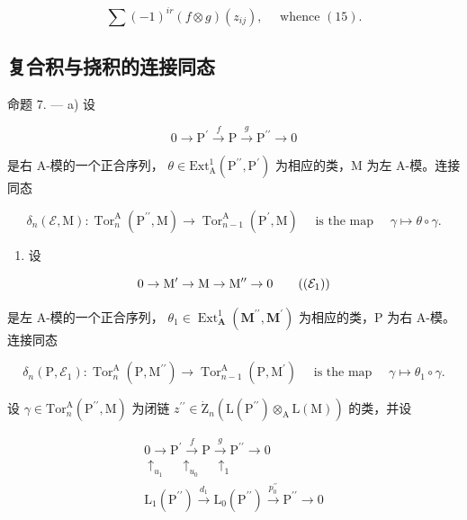 \[
\sum (- 1) ^ {i r} (f \otimes g) (z _ {i j}), \quad \text { whence } (1 5).
\]

\subsection{复合积与挠积的连接同态}

命题 7. --- a) 设

\[
0 \to \mathrm{P} ^ {\prime} \xrightarrow {f} \mathrm{P} \xrightarrow {g} \mathrm{P} ^ {\prime \prime} \to 0\tag{8}
\]

是右 A-模的一个正合序列， \(\theta\in\mathrm{Ext}_{\mathrm{A}}^{1}\left(\mathrm{P}^{\prime\prime},\mathrm{P}^{\prime}\right)\) 为相应的类，M 为左 A-模。连接同态

\[
\delta_ {n} (\mathcal {E}, \mathrm{M}): \operatorname{Tor} _ {n} ^ {\mathrm{A}} \left(\mathrm{P} ^ {\prime \prime}, \mathrm{M}\right)\rightarrow \operatorname{Tor} _ {n - 1} ^ {\mathrm{A}} \left(\mathrm{P} ^ {\prime}, \mathrm{M}\right) \quad \text { is the map } \quad\gamma \mapsto \theta \circ \gamma .
\]

\begin{enumerate}
\def\labelenumi{\alph{enumi})}
\setcounter{enumi}{1}
\tightlist
\item
  设
\end{enumerate}

\[
0 \rightarrow \mathrm{M} ^ {\prime} \rightarrow \mathrm{M} \rightarrow \mathrm{M} ^ {\prime \prime} \rightarrow 0\tag{$(\mathcal{E}_1)$}
\]

是左 A-模的一个正合序列， \(\theta_{1} \in \operatorname{Ext}_{\mathbf{A}}^{1}(\mathbf{M}^{\prime \prime}, \mathbf{M}^{\prime})\) 为相应的类，P 为右 A-模。连接同态

\[
\delta_ {n} (\mathrm{P}, \mathcal {E} _ {1}): \operatorname{Tor} _ {n} ^ {\mathrm{A}} (\mathrm{P}, \mathrm{M} ^ {\prime \prime}) \rightarrow \operatorname{Tor} _ {n - 1} ^ {\mathrm{A}} (\mathrm{P}, \mathrm{M} ^ {\prime}) \quad \text { is the map } \quad\gamma \mapsto \theta_ {1} \circ \gamma .
\]

设 \(\gamma\in\mathrm{Tor}_{n}^{\mathrm{A}}(\mathrm{P}^{\prime\prime},\mathrm{M})\) 为闭链 \(z^{\prime\prime}\in\dot{\mathrm{Z}}_{n}(\mathrm{L}(\mathrm{P}^{\prime\prime})\otimes_{\mathrm{A}}\mathrm{L}(\mathrm{M}))\) 的类，并设

\[
\begin{array}{c} 0 \longrightarrow \mathrm{P} ^ {\prime} \xrightarrow {f} \mathrm{P} \xrightarrow {g} \mathrm{P} ^ {\prime \prime} \longrightarrow 0 \\ \uparrow_ {u _ {1}} \quad \uparrow_ {u _ {0}} \quad \uparrow_ {1} \\ \mathrm{L} _ {1} (\mathrm{P} ^ {\prime \prime}) \xrightarrow {d _ {1}} \mathrm{L} _ {0} (\mathrm{P} ^ {\prime \prime}) \xrightarrow {p _ {0} ^ {\prime \prime}} \mathrm{P} ^ {\prime \prime} \longrightarrow 0 \end{array}
\]


